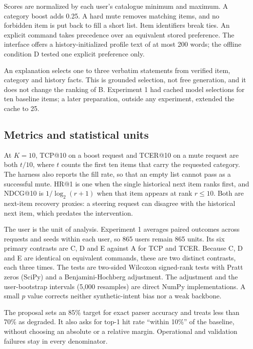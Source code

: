 \documentclass[conference]{IEEEtran}
\begin{document}
Scores are normalized by each user's catalogue minimum and maximum. A category boost adds 0.25. A hard mute removes matching items, and no forbidden item is put back to fill a short list. Item identifiers break ties. An explicit command takes precedence over an equivalent stored preference. The interface offers a history-initialized profile text of at most 200 words; the offline condition D tested one explicit preference only.

An explanation selects one to three verbatim statements from verified item, category and history facts. This is grounded selection, not free generation, and it does not change the ranking of B. Experiment 1 had cached model selections for ten baseline items; a later preparation, outside any experiment, extended the cache to 25.

\subsection{Metrics and statistical units}
At $K=10$, TCP@10 on a boost request and TCER@10 on a mute request are both $t/10$, where $t$ counts the first ten items that carry the requested category. The harness also reports the fill rate, so that an empty list cannot pass as a successful mute. HR@1 is one when the single historical next item ranks first, and NDCG@10 is $1/\log_2(r+1)$ when that item appears at rank $r\leq10$. Both are next-item recovery proxies: a steering request can disagree with the historical next item, which predates the intervention.

The user is the unit of analysis. Experiment 1 averages paired outcomes across requests and seeds within each user, so 865 users remain 865 units. Its six primary contrasts are C, D and E against A for TCP and TCER. Because C, D and E are identical on equivalent commands, these are two distinct contrasts, each three times. The tests are two-sided Wilcoxon signed-rank tests with Pratt zeros (SciPy) and a Benjamini-Hochberg adjustment. The adjustment and the user-bootstrap intervals (5,000 resamples) are direct NumPy implementations. A small $p$ value corrects neither synthetic-intent bias nor a weak backbone.

The proposal sets an 85\% target for exact parser accuracy and treats less than 70\% as degraded. It also asks for top-1 hit rate ``within 10\%'' of the baseline, without choosing an absolute or a relative margin. Operational and validation failures stay in every denominator.
\end{document}
